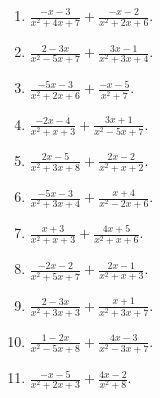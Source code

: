 \documentclass[11pt,oneside]{book}
\begin{document}
\begin{enumerate}[leftmargin=*,label=\textbf{W\arabic*.},itemsep=0.45\baselineskip]
\item $\displaystyle \frac{- x - 3}{x^{2} + 4 x + 7} + \frac{- x - 2}{x^{2} + 2 x + 6}$.
\item $\displaystyle \frac{2 - 3 x}{x^{2} - 5 x + 7} + \frac{3 x - 1}{x^{2} + 3 x + 4}$.
\item $\displaystyle \frac{- 5 x - 3}{x^{2} + 2 x + 6} + \frac{- x - 5}{x^{2} + 7}$.
\item $\displaystyle \frac{- 2 x - 4}{x^{2} + x + 3} + \frac{3 x + 1}{x^{2} - 5 x + 7}$.
\item $\displaystyle \frac{2 x - 5}{x^{2} + 3 x + 8} + \frac{2 x - 2}{x^{2} + x + 2}$.
\item $\displaystyle \frac{- 5 x - 3}{x^{2} + 3 x + 4} + \frac{x + 4}{x^{2} - 2 x + 6}$.
\item $\displaystyle \frac{x + 3}{x^{2} + x + 3} + \frac{4 x + 5}{x^{2} + x + 6}$.
\item $\displaystyle \frac{- 2 x - 2}{x^{2} + 5 x + 7} + \frac{2 x - 1}{x^{2} + x + 3}$.
\item $\displaystyle \frac{2 - 3 x}{x^{2} + 3 x + 3} + \frac{x + 1}{x^{2} + 3 x + 7}$.
\item $\displaystyle \frac{1 - 2 x}{x^{2} - 5 x + 8} + \frac{4 x - 3}{x^{2} - 3 x + 7}$.
\item $\displaystyle \frac{- x - 5}{x^{2} + 2 x + 3} + \frac{4 x - 2}{x^{2} + 8}$.
\end{enumerate}
\end{document}
